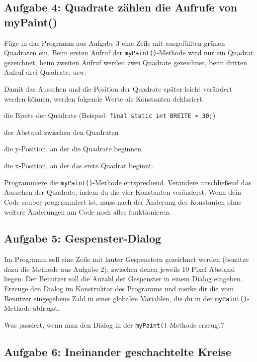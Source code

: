 \subsection{Aufgabe 4: Quadrate zählen die Aufrufe von myPaint()}

Füge in das Programm aus Aufgabe 3 eine Zeile mit ausgefüllten grünen Quadraten
ein. Beim ersten Aufruf der \lstinline|myPaint()|-Methode wird nur ein Quadrat
gezeichnet, beim zweiten Aufruf werden zwei Quadrate gezeichnet, beim dritten
Aufruf drei Quadrate, usw.

Damit das Aussehen und die Position der Quadrate später leicht verändert werden
können, werden folgende Werte als Konstanten deklariert:

\begin{compactitem}
\item die Breite der Quadrate (Beispiel: \lstinline|final static int BREITE = 30;|)
\item der Abstand zwischen den Quadraten
\item die y-Position, an der die Quadrate beginnen
\item die x-Position, an der das erste Quadrat beginnt.
\end{compactitem} 

Programmiere die \lstinline|myPaint()|-Methode entsprechend. Verändere
anschließend das Aussehen der Quadrate, indem du die vier Konstanten
veränderst. Wenn dein Code sauber programmiert ist, muss nach der Änderung der
Konstanten ohne weitere Änderungen am Code noch alles funktionieren.


\subsection{Aufgabe 5: Gespenster-Dialog}

Im Programm soll eine Zeile mit lauter Gespenstern gezeichnet werden (benutze
dazu die Methode aus Aufgabe 2), zwischen denen jeweils 10 Pixel Abstand
liegen. Der Benutzer soll die Anzahl der Gespenster in einem Dialog eingeben.
Erzeuge den Dialog im Konstruktor des Programms und merke dir die vom Benutzer
eingegebene Zahl in einer globalen Variablen, die du in der
\lstinline|myPaint()|-Methode abfragst.

Was passiert, wenn man den Dialog in der \lstinline|myPaint()|-Methode erzeugt?


\subsection{Aufgabe 6: Ineinander geschachtelte Kreise}

